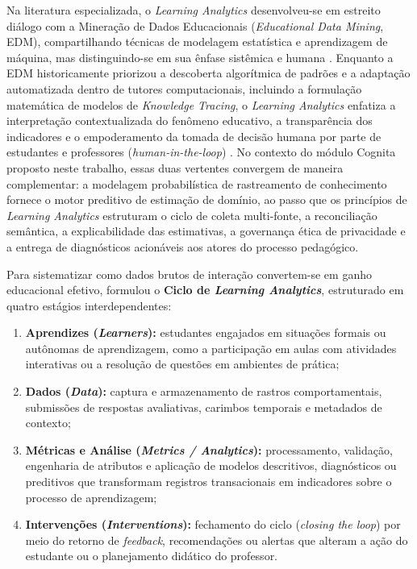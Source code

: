 Na literatura especializada, o \textit{Learning Analytics} desenvolveu-se em estreito diálogo com a Mineração de Dados Educacionais (\textit{Educational Data Mining}, EDM), compartilhando técnicas de modelagem estatística e aprendizagem de máquina, mas distinguindo-se em sua ênfase sistêmica e humana \cite{siemens_learning_2012}. Enquanto a EDM historicamente priorizou a descoberta algorítmica de padrões e a adaptação automatizada dentro de tutores computacionais, incluindo a formulação matemática de modelos de \textit{Knowledge Tracing}, o \textit{Learning Analytics} enfatiza a interpretação contextualizada do fenômeno educativo, a transparência dos indicadores e o empoderamento da tomada de decisão humana por parte de estudantes e professores (\textit{human-in-the-loop}) \cite{siemens_learning_2012, gaevic_learning_2015}. No contexto do módulo Cognita proposto neste trabalho, essas duas vertentes convergem de maneira complementar: a modelagem probabilística de rastreamento de conhecimento fornece o motor preditivo de estimação de domínio, ao passo que os princípios de \textit{Learning Analytics} estruturam o ciclo de coleta multi-fonte, a reconciliação semântica, a explicabilidade das estimativas, a governança ética de privacidade e a entrega de diagnósticos acionáveis aos atores do processo pedagógico.

Para sistematizar como dados brutos de interação convertem-se em ganho educacional efetivo,  formulou o \textbf{Ciclo de \textit{Learning Analytics}}, estruturado em quatro estágios interdependentes:
\begin{enumerate}
    \item \textbf{Aprendizes (\textit{Learners}):} estudantes engajados em situações formais ou autônomas de aprendizagem, como a participação em aulas com atividades interativas ou a resolução de questões em ambientes de prática;
    \item \textbf{Dados (\textit{Data}):} captura e armazenamento de rastros comportamentais, submissões de respostas avaliativas, carimbos temporais e metadados de contexto;
    \item \textbf{Métricas e Análise (\textit{Metrics / Analytics}):} processamento, validação, engenharia de atributos e aplicação de modelos descritivos, diagnósticos ou preditivos que transformam registros transacionais em indicadores sobre o processo de aprendizagem;
    \item \textbf{Intervenções (\textit{Interventions}):} fechamento do ciclo (\textit{closing the loop}) por meio do retorno de \textit{feedback}, recomendações ou alertas que alteram a ação do estudante ou o planejamento didático do professor.
\end{enumerate}

